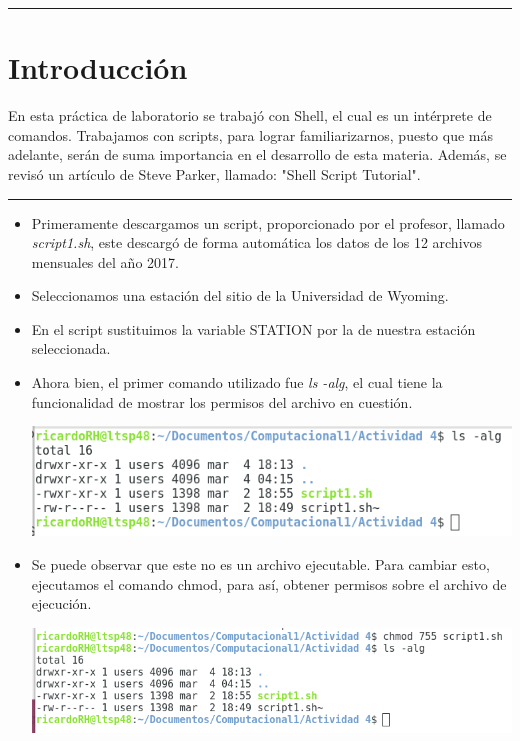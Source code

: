 \documentclass{article}
\begin{document}
\pagebreak
\begin{doublespace}


\hrule
\section{Introducción}

En esta práctica de laboratorio se trabajó con Shell, el cual es un intérprete de comandos. Trabajamos con scripts, para lograr familiarizarnos, puesto que más adelante, serán de suma importancia en el desarrollo de esta materia. Además, se revisó un artículo de Steve Parker, llamado: "Shell Script Tutorial". \\


\hrule
\begin{itemize}

\section{Actividad}

\item Primeramente descargamos un script, proporcionado por el profesor, llamado \textit{script1.sh}, este descargó de forma automática los datos de los 12 archivos mensuales del año 2017.
\item Seleccionamos una estación del sitio de la Universidad de Wyoming.
\item En el script sustituimos la variable STATION por la de nuestra estación seleccionada.
\item Ahora bien, el primer comando utilizado fue \textit{ls -alg}, el cual tiene la funcionalidad de mostrar los permisos del archivo en cuestión.
\\
\begin{center}
\includegraphics[scale=0.5]{act41.png}
\end{center}

\item Se puede observar que este no es un archivo ejecutable. Para cambiar esto, ejecutamos el comando chmod, para así, obtener permisos sobre el archivo de ejecución.
\\
\begin{center}
\includegraphics[scale=0.5]{act42.png}
\end{center}


\end{itemize}
\end{doublespace}
\end{document}
